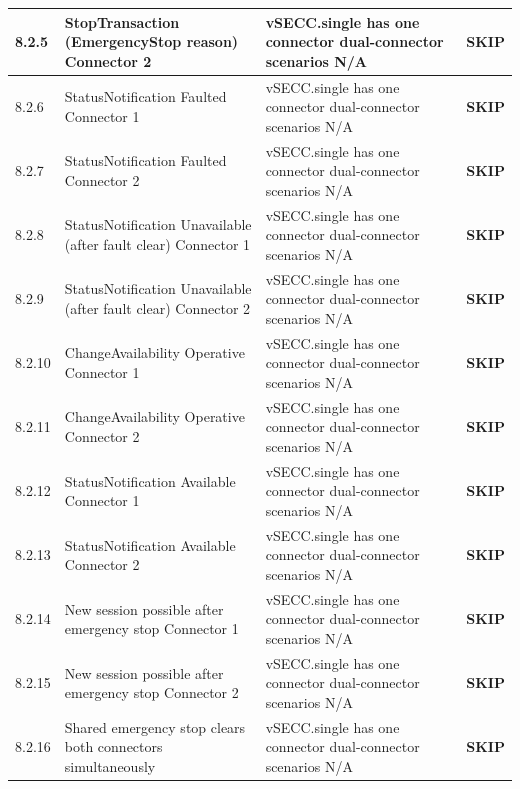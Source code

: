 \documentclass[10pt, a4paper]{article}
\begin{document}
\begin{longtable}{|L{1cm}|L{5.5cm}|M{7cm}|C{1.8cm}|}
\small 8.2.5 & \small StopTransaction (EmergencyStop reason)  Connector 2 & vSECC.single has one connector  dual-connector scenarios N/A & \textcolor{skipgray}{\textbf{SKIP}} \\
\hline
\small 8.2.6 & \small StatusNotification Faulted  Connector 1 & vSECC.single has one connector  dual-connector scenarios N/A & \textcolor{skipgray}{\textbf{SKIP}} \\
\hline
\small 8.2.7 & \small StatusNotification Faulted  Connector 2 & vSECC.single has one connector  dual-connector scenarios N/A & \textcolor{skipgray}{\textbf{SKIP}} \\
\hline
\small 8.2.8 & \small StatusNotification Unavailable (after fault clear)  Connector 1 & vSECC.single has one connector  dual-connector scenarios N/A & \textcolor{skipgray}{\textbf{SKIP}} \\
\hline
\small 8.2.9 & \small StatusNotification Unavailable (after fault clear)  Connector 2 & vSECC.single has one connector  dual-connector scenarios N/A & \textcolor{skipgray}{\textbf{SKIP}} \\
\hline
\small 8.2.10 & \small ChangeAvailability Operative  Connector 1 & vSECC.single has one connector  dual-connector scenarios N/A & \textcolor{skipgray}{\textbf{SKIP}} \\
\hline
\small 8.2.11 & \small ChangeAvailability Operative  Connector 2 & vSECC.single has one connector  dual-connector scenarios N/A & \textcolor{skipgray}{\textbf{SKIP}} \\
\hline
\small 8.2.12 & \small StatusNotification Available  Connector 1 & vSECC.single has one connector  dual-connector scenarios N/A & \textcolor{skipgray}{\textbf{SKIP}} \\
\hline
\small 8.2.13 & \small StatusNotification Available  Connector 2 & vSECC.single has one connector  dual-connector scenarios N/A & \textcolor{skipgray}{\textbf{SKIP}} \\
\hline
\small 8.2.14 & \small New session possible after emergency stop  Connector 1 & vSECC.single has one connector  dual-connector scenarios N/A & \textcolor{skipgray}{\textbf{SKIP}} \\
\hline
\small 8.2.15 & \small New session possible after emergency stop  Connector 2 & vSECC.single has one connector  dual-connector scenarios N/A & \textcolor{skipgray}{\textbf{SKIP}} \\
\hline
\small 8.2.16 & \small Shared emergency stop clears both connectors simultaneously & vSECC.single has one connector  dual-connector scenarios N/A & \textcolor{skipgray}{\textbf{SKIP}} \\

\end{longtable}
\end{document}
